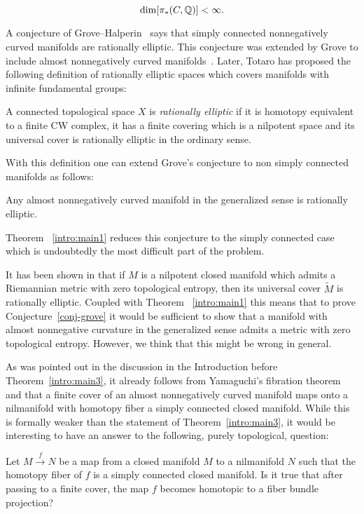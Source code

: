 \documentclass{amsart}
\begin{document}
\[
\dim [\pi_*(C,{\Bbb Q})]<\infty.
\]




A conjecture of Grove--Halperin~\cite{GH} says that simply connected nonnegatively curved manifolds are rationally elliptic. 
This conjecture was extended by Grove to include almost nonnegatively curved manifolds~\cite{Grv}.
Later, Totaro has proposed the following definition of  rationally elliptic spaces which covers manifolds with infinite fundamental groups:

A connected topological space $X$ is {\it  rationally elliptic}
if it is homotopy equivalent to a finite CW complex,
it has a finite covering which is a nilpotent space
and its universal cover is rationally elliptic in the ordinary sense.

With this definition one can extend Grove's conjecture  
to non simply connected manifolds as follows:

\begin{conj}\label{conj-grove}
Any almost nonnegatively curved manifold in the generalized sense is rationally elliptic.
\end{conj}

Theorem ~\ref{intro:main1}  reduces this conjecture to the simply connected case which is undoubtedly the most difficult part of the problem.



It has been shown in \cite{PaPe} that if $M$ is a nilpotent closed manifold which admits a Riemannian metric with zero topological entropy, then its universal cover $\tilde{M}$ is rationally elliptic.
Coupled with  Theorem ~\ref{intro:main1} this means that to prove Conjecture~\ref{conj-grove} it would be sufficient to show that a manifold with almost nonnegative curvature in
the
generalized sense admits a metric with zero topological entropy.
However, we think that this
 might be wrong in general.

\medskip

As was pointed out in the discussion in the Introduction before Theorem~\ref{intro:main3},  it already follows from Yamaguchi's fibration theorem
and \cite{FY}
that a finite cover of an almost nonnegatively curved manifold maps onto a nilmanifold
  with homotopy fiber a simply connected closed manifold.
While this is formally weaker than the statement of Theorem~\ref{intro:main3}, it would be interesting to
have an answer to the following, purely topological, question:


\begin{quest}
Let $ M \overset{f}{\longrightarrow} N$ be a map from a  closed manifold $M$
to  a nilmanifold $N$ such that  the homotopy fiber of $f$ is  a simply connected closed manifold.
Is it true that after passing to a finite cover, the map
$f$ becomes homotopic to a fiber bundle projection?
\end{quest}
\end{document}
